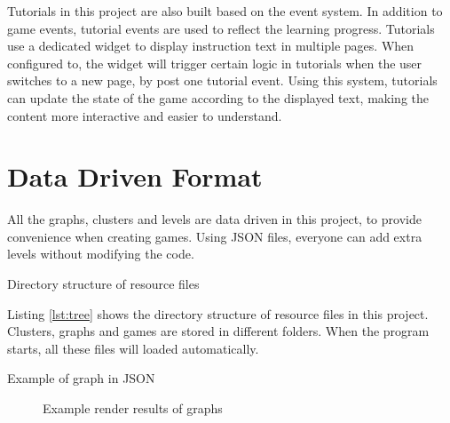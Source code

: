 \documentclass[msc,deptreport, cs]{infthesis}
\begin{document}
Tutorials in this project are also built based on the event system. In addition to game events, tutorial events are used to reflect the learning progress. Tutorials use a dedicated widget to display instruction text in multiple pages. When configured to, the widget will trigger certain logic in tutorials when the user switches to a new page, by post one tutorial event. Using this system, tutorials can update the state of the game according to the displayed text, making the content more interactive and easier to understand.

\section{Data Driven Format} \label{sec:format}

All the graphs, clusters and levels are data driven in this project, to provide convenience when creating games. Using JSON files, everyone can add extra levels without modifying the code.

\vspace{0.5em}
\begin{lstfloat}
  
  \caption{Directory structure of resource files}
  \label{lst:tree}
  \vspace{-1em}
\end{lstfloat}
\vspace{-0.5em}

Listing \ref{lst:tree} shows the directory structure of resource files in this project. Clusters, graphs and games are stored in different folders. When the program starts, all these files will loaded automatically.

\vspace{0.5em}
\begin{lstfloat}[!htb]
  
  \caption{Example of graph in JSON}
  \label{lst:graph}
  \vspace{-1em}
\end{lstfloat}
\vspace{-0.5em}

\begin{figure}[!htb]
  \centering
   \hspace{2em}
  \caption{Example render results of graphs}
  \label{fig:json}
\end{figure}
\end{document}
